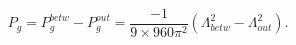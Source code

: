 \begin{equation}
 P_{g}=P^{betw}_{g}-P^{out}_{g}=\frac{-1}{9\times 960\pi^{2}}
 (\Lambda_{betw}^{2}-\Lambda_{out}^{2}).
 \end{equation}

